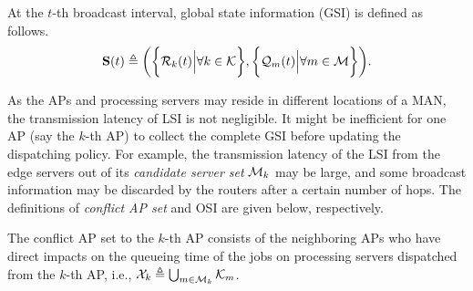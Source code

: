 %
\begin{definition}
    At the $t$-th broadcast interval, global state information (GSI) is defined as follows.
    {\small
    \begin{align}
        \mathbf{S}(t) \triangleq
            \bigg(
                \bigg\{\mathcal{R}_{k}(t) \Big| \forall k\in\mathcal{K}\bigg\},
                \bigg\{\mathcal{Q}_{m}(t) \Big| \forall m\in\mathcal{M}\bigg\}
            \bigg).
    \end{align}
    }%
\end{definition}

As the APs and processing servers may reside in different locations of a MAN, the transmission latency of LSI is not negligible. %
It might be inefficient for one AP (say the $k$-th AP) to collect the complete GSI before updating the dispatching policy.
For example, the transmission latency of the LSI from the edge servers out of its \emph{candidate server set} $\mathcal{M}_{k}$ may be large, and some broadcast information may be discarded by the routers after a certain number of hops.
%
The definitions of \emph{conflict AP set} and OSI are given below, respectively.
\begin{definition}
    The conflict AP set to the $k$-th AP consists of the neighboring APs who have direct impacts on the queueing time of the jobs on processing servers dispatched from the $k$-th AP, i.e., $ \mathcal{X}_{k} \triangleq \bigcup_{m\in\mathcal{M}_{k}} \mathcal{K}_{m}$.
\end{definition}

